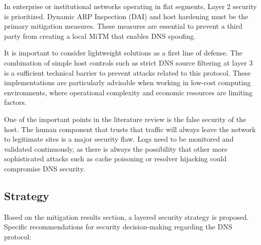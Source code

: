 \documentclass[conference]{IEEEtran}
\begin{document}
In enterprise or institutional networks operating in flat segments, Layer 2 security is prioritized. Dynamic ARP Inspection (DAI) and host hardening must be the primary mitigation measures. These measures are essential to prevent a third party from creating a local MiTM that enables DNS spoofing.

It is important to consider lightweight solutions as a first line of defense. The combination of simple host controls such as strict DNS source filtering at layer 3 is a sufficient technical barrier to prevent attacks related to this protocol. These implementations are particularly advisable when working in low-cost computing environments, where operational complexity and economic resources are limiting factors.

One of the important points in the literature review is the false security of the host. The human component that trusts that traffic will always leave the network to legitimate sites is a major security flaw. Logs need to be monitored and validated continuously, as there is always the possibility that other more sophisticated attacks such as cache poisoning or resolver hijacking could compromise DNS security.

\subsection{Strategy}

Based on the mitigation results section, a layered security strategy is proposed. Specific recommendations for security decision-making regarding the DNS protocol:
\end{document}
